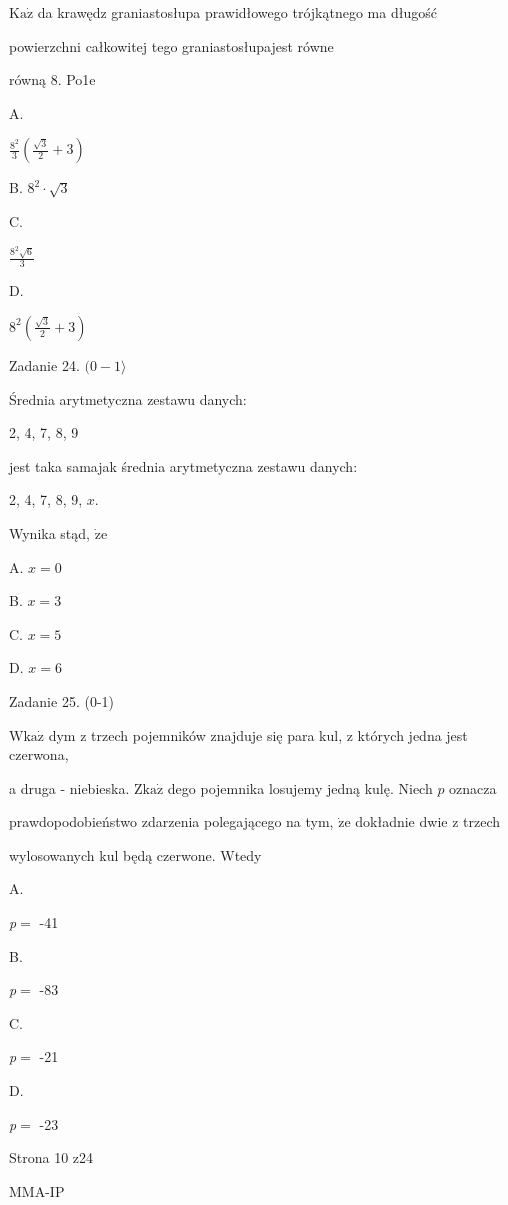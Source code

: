 \documentclass[a4paper,12pt]{article}
\begin{document}
$\mathrm{K}\mathrm{a}\dot{\mathrm{z}}$ da krawędz graniastosłupa prawidłowego trójkątnego ma długość

powierzchni całkowitej tego graniastosłupajest równe

równą 8. Po1e

A.

$\displaystyle \frac{8^{2}}{3}(\frac{\sqrt{3}}{2}+3)$

B. $8^{2}\cdot\sqrt{3}$

C.

$\displaystyle \frac{8^{2}\sqrt{6}}{3}$

D.

$8^{2}(\displaystyle \frac{\sqrt{3}}{2}+3)$

Zadanie 24. $(0-1\rangle$

Średnia arytmetyczna zestawu danych:

2, 4, 7, 8, 9

jest taka samajak średnia arytmetyczna zestawu danych:

2, 4, 7, 8, 9, $x.$

Wynika stąd, $\dot{\mathrm{z}}\mathrm{e}$

A. $x=0$

B. $x=3$

C. $x=5$

D. $x=6$

Zadanie 25. (0-1)

$\mathrm{W} \mathrm{k}\mathrm{a}\dot{\mathrm{z}}$ dym z trzech pojemników znajduje się para kul, z których jedna jest czerwona,

a druga - niebieska. $\mathrm{Z} \mathrm{k}\mathrm{a}\dot{\mathrm{z}}$ dego pojemnika losujemy jedną kulę. Niech $p$ oznacza

prawdopodobieństwo zdarzenia polegającego na tym, $\dot{\mathrm{z}}\mathrm{e}$ dokładnie dwie z trzech

wylosowanych kul będą czerwone. Wtedy

A.

{\it p}$=$ -41

B.

{\it p}$=$ -83

C.

{\it p}$=$ -21

D.

{\it p}$=$ -23

Strona 10 z24

MMA-IP
\end{document}
